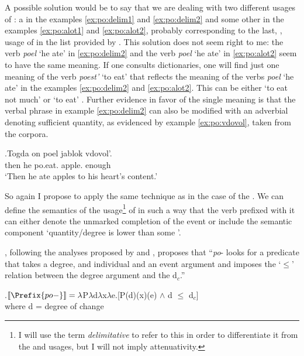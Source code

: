 A possible solution would be to say that we are dealing with two different usages of : a  in the examples \ref{ex:po:delim1} and \ref{ex:po:delim2} and some other in the examples \ref{ex:po:alot1} and \ref{ex:po:alot2}, probably corresponding to the last, , usage of  in the list provided by \citet{Shvedova:82}. This solution does not seem right to me: the verb \textit{poel} `he ate' in \ref{ex:po:delim2} and the verb \textit{poel} `he ate' in \ref{ex:po:alot2} seem to have the same meaning. If one consults dictionaries, one will find just one meaning of the verb \textit{poest'} `to eat' that reflects the meaning of the verbs \textit{poel} `he ate' in the examples \ref{ex:po:delim2} and \ref{ex:po:alot2}. This can be either `to eat not much' \citep{Ushakov:50} or `to eat' \citep{Efremova:00}. Further evidence in favor of the single meaning is that the verbal phrase in example \ref{ex:po:delim2} can also be modified with an adverbial denoting sufficient quantity, as evidenced by example \ref{ex:po:vdovol}, taken from the corpora.

\exg.\label{ex:po:vdovol}Togda on poel jablok vdovol'.\\
then he po.eat. apple. enough\\
\trans `Then he ate apples to his heart's content.'\\

So again I propose to apply the same technique as in the case of the  . We can define the semantics of the  usage\footnote{I will use the term \textit{delimitative} to refer to this in order to differentiate it from the  and  usages, but I will not imply attenuativity.} of  in such a way that the verb prefixed with it can either denote the unmarked completion of the event or include the semantic component `quantity/degree is lower than some '. 

\citet[48]{Kagan:book}, following the analyses proposed by \citet{Filip:00} and \citet{Souchkova:04}, proposes that ``\textit{po}- looks for a predicate that takes a degree, and individual and an event argument and imposes the `$\leqslant$' relation between the degree argument and the   d$_c$.''

\ex.\label{Kagan:po}$\llbracket \Prefix{po-} \rrbracket = \lambda$P$\lambda$d$\lambda$x$\lambda$e.[P(d)(x)(e) $\wedge$ d $\leqslant$ d$_c$]\\
where d = degree of change \citep{KennedyLevin:02}


